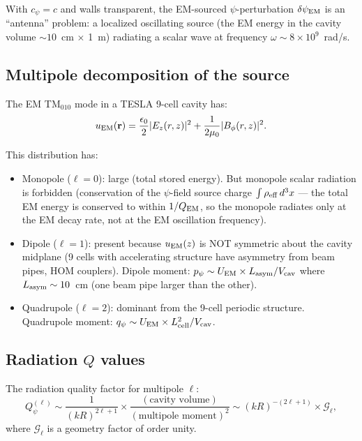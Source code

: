 \documentclass[11pt]{article}
\newcommand{\ee}[1]{\times 10^{#1}}
\newcommand{\dpsi}{\delta\psi}
\newcommand{\Qpsi}{Q_\psi}
\theoremstyle{definition}
\theoremstyle{remark}
\begin{document}
With $c_\psi = c$ and walls transparent, the EM-sourced $\psi$-perturbation
$\dpsi_{\rm EM}$ is an ``antenna'' problem: a localized oscillating
source (the EM energy in the cavity volume $\sim 10$~cm $\times$ 1~m)
radiating a scalar wave at frequency $\omega \sim 8\ee{9}$~rad/s.

\subsection{Multipole decomposition of the source}

The EM TM$_{010}$ mode in a TESLA 9-cell cavity has:
\begin{equation}
u_{\rm EM}(\mathbf{r}) = \frac{\epsilon_0}{2}|E_z(r,z)|^2
+ \frac{1}{2\mu_0}|B_\phi(r,z)|^2.
\end{equation}

This distribution has:
\begin{itemize}[nosep]
\item Monopole ($\ell = 0$): large (total stored energy). But monopole
  scalar radiation is forbidden (conservation of the $\psi$-field
  source charge $\int \rho_{\rm eff}\,d^3x$ --- the total EM energy
  is conserved to within $1/Q_{\rm EM}$, so the monopole radiates
  only at the EM decay rate, not at the EM oscillation frequency).
\item Dipole ($\ell = 1$): present because $u_{\rm EM}(z)$ is NOT
  symmetric about the cavity midplane (9 cells with accelerating
  structure have asymmetry from beam pipes, HOM couplers).
  Dipole moment: $p_\psi \sim U_{\rm EM} \times L_{\rm asym}/V_{\rm cav}$
  where $L_{\rm asym} \sim 10$~cm (one beam pipe larger than the other).
\item Quadrupole ($\ell = 2$): dominant from the 9-cell periodic
  structure. Quadrupole moment: $q_\psi \sim U_{\rm EM} \times
  L_{\rm cell}^2/V_{\rm cav}$.
\end{itemize}

\subsection{Radiation $Q$ values}

The radiation quality factor for multipole $\ell$:
\begin{equation}
\Qpsi^{(\ell)} \sim \frac{1}{(kR)^{2\ell+1}}
\times \frac{(\text{cavity volume})}{(\text{multipole moment})^2}
\sim (kR)^{-(2\ell+1)} \times \mathcal{G}_\ell,
\end{equation}
where $\mathcal{G}_\ell$ is a geometry factor of order unity.
\end{document}
